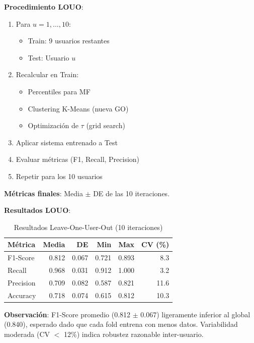 \documentclass[12pt,letterpaper,twoside]{report}
\begin{document}
\begin{estadisticobox}
\textbf{Procedimiento LOUO}:

\begin{enumerate}[noitemsep]
    \item Para $u = 1, \ldots, 10$:
    \begin{itemize}[noitemsep]
        \item Train: 9 usuarios restantes
        \item Test: Usuario $u$
    \end{itemize}
    \item Recalcular en Train:
    \begin{itemize}[noitemsep]
        \item Percentiles para MF
        \item Clustering K-Means (nueva GO)
        \item Optimización de $\tau$ (grid search)
    \end{itemize}
    \item Aplicar sistema entrenado a Test
    \item Evaluar métricas (F1, Recall, Precision)
    \item Repetir para los 10 usuarios
\end{enumerate}

\textbf{Métricas finales}: Media $\pm$ DE de las 10 iteraciones.
\end{estadisticobox}

\begin{calculobox}
\textbf{Resultados LOUO}:

\begin{table}[H]
\centering
\caption{Resultados Leave-One-User-Out (10 iteraciones)}
\label{tab:louo_results}
\begin{tabular}{@{}lrrrrr@{}}
\toprule
\textbf{Métrica} & \textbf{Media} & \textbf{DE} & \textbf{Min} & \textbf{Max} & \textbf{CV (\%)} \\
\midrule
F1-Score         & 0.812 & 0.067 & 0.721 & 0.893 & 8.3 \\
Recall           & 0.968 & 0.031 & 0.912 & 1.000 & 3.2 \\
Precision        & 0.709 & 0.082 & 0.587 & 0.821 & 11.6 \\
Accuracy         & 0.718 & 0.074 & 0.615 & 0.812 & 10.3 \\
\bottomrule
\end{tabular}
\end{table}

\textbf{Observación}: F1-Score promedio (0.812 $\pm$ 0.067) ligeramente inferior al global (0.840), esperado dado que cada fold entrena con menos datos. Variabilidad moderada (CV $<$ 12\%) indica robustez razonable inter-usuario.
\end{calculobox}
\end{document}
